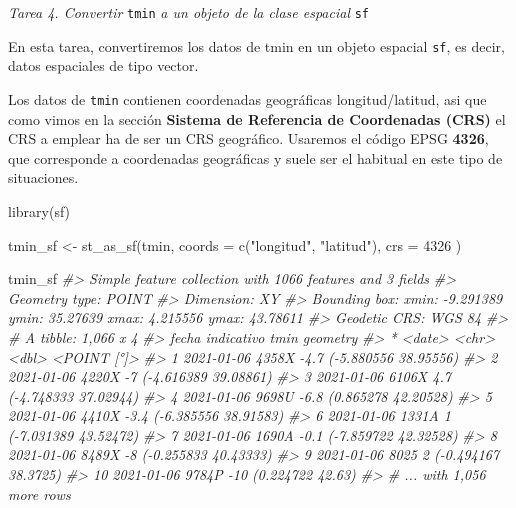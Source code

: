 \documentclass[
]{report}
\newenvironment{Shaded}{\begin{snugshade}}{\end{snugshade}}
\newcommand{\AttributeTok}[1]{\textcolor[rgb]{0.77,0.63,0.00}{#1}}
\newcommand{\CommentTok}[1]{\textcolor[rgb]{0.56,0.35,0.01}{\textit{#1}}}
\newcommand{\DecValTok}[1]{\textcolor[rgb]{0.00,0.00,0.81}{#1}}
\newcommand{\FunctionTok}[1]{\textcolor[rgb]{0.00,0.00,0.00}{#1}}
\newcommand{\NormalTok}[1]{#1}
\newcommand{\OtherTok}[1]{\textcolor[rgb]{0.56,0.35,0.01}{#1}}
\newcommand{\StringTok}[1]{\textcolor[rgb]{0.31,0.60,0.02}{#1}}
\theoremstyle{definition}
\theoremstyle{definition}
\theoremstyle{definition}
\theoremstyle{definition}
\theoremstyle{remark}
\begin{document}
\emph{Tarea 4. Convertir} \texttt{tmin} \emph{a un objeto de la clase espacial} \texttt{sf}

En esta tarea, convertiremos los datos de tmin en un objeto espacial \texttt{sf}, es
decir, datos espaciales de tipo vector.

Los datos de \texttt{tmin} contienen coordenadas geográficas longitud/latitud, asi que
como vimos en la sección \textbf{Sistema de Referencia de Coordenadas (CRS)} el CRS a
emplear ha de ser un CRS geográfico. Usaremos el código EPSG \textbf{4326}, que
corresponde a coordenadas geográficas y suele ser el habitual en este tipo de
situaciones.

\begin{Shaded}
\begin{Highlighting}[]
\FunctionTok{library}\NormalTok{(sf)}

\NormalTok{tmin\_sf }\OtherTok{\textless{}{-}} \FunctionTok{st\_as\_sf}\NormalTok{(tmin,}
  \AttributeTok{coords =} \FunctionTok{c}\NormalTok{(}\StringTok{"longitud"}\NormalTok{, }\StringTok{"latitud"}\NormalTok{),}
  \AttributeTok{crs =} \DecValTok{4326}
\NormalTok{)}

\NormalTok{tmin\_sf}
\CommentTok{\#\textgreater{} Simple feature collection with 1066 features and 3 fields}
\CommentTok{\#\textgreater{} Geometry type: POINT}
\CommentTok{\#\textgreater{} Dimension:     XY}
\CommentTok{\#\textgreater{} Bounding box:  xmin: {-}9.291389 ymin: 35.27639 xmax: 4.215556 ymax: 43.78611}
\CommentTok{\#\textgreater{} Geodetic CRS:  WGS 84}
\CommentTok{\#\textgreater{} \# A tibble: 1,066 x 4}
\CommentTok{\#\textgreater{}    fecha      indicativo  tmin             geometry}
\CommentTok{\#\textgreater{}  * \textless{}date\textgreater{}     \textless{}chr\textgreater{}      \textless{}dbl\textgreater{}          \textless{}POINT [°]\textgreater{}}
\CommentTok{\#\textgreater{}  1 2021{-}01{-}06 4358X       {-}4.7 ({-}5.880556 38.95556)}
\CommentTok{\#\textgreater{}  2 2021{-}01{-}06 4220X       {-}7   ({-}4.616389 39.08861)}
\CommentTok{\#\textgreater{}  3 2021{-}01{-}06 6106X        4.7 ({-}4.748333 37.02944)}
\CommentTok{\#\textgreater{}  4 2021{-}01{-}06 9698U       {-}6.8  (0.865278 42.20528)}
\CommentTok{\#\textgreater{}  5 2021{-}01{-}06 4410X       {-}3.4 ({-}6.385556 38.91583)}
\CommentTok{\#\textgreater{}  6 2021{-}01{-}06 1331A        1   ({-}7.031389 43.52472)}
\CommentTok{\#\textgreater{}  7 2021{-}01{-}06 1690A       {-}0.1 ({-}7.859722 42.32528)}
\CommentTok{\#\textgreater{}  8 2021{-}01{-}06 8489X       {-}8   ({-}0.255833 40.43333)}
\CommentTok{\#\textgreater{}  9 2021{-}01{-}06 8025         2    ({-}0.494167 38.3725)}
\CommentTok{\#\textgreater{} 10 2021{-}01{-}06 9784P      {-}10       (0.224722 42.63)}
\CommentTok{\#\textgreater{} \# ... with 1,056 more rows}
\end{Highlighting}
\end{Shaded}
\end{document}
